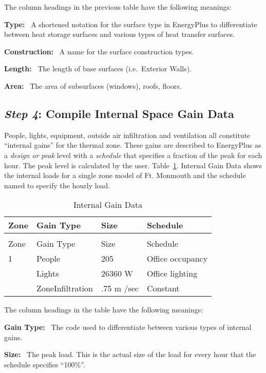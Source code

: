The column headings in the previous table have the following meanings:

\textbf{Type:}~ A shortened notation for the surface type in EnergyPlus to differentiate between heat storage surfaces and various types of heat transfer surfaces.

\textbf{Construction:}~ A name for the surface construction types.

\textbf{Length:}~ The length of base surfaces (i.e.~Exterior Walls).

\textbf{Area:}~ The area of subsurfaces (windows), roofs, floors.

\subsection{\emph{Step 4}: Compile Internal Space Gain Data}\label{step-4-compile-internal-space-gain-data}

People, lights, equipment, outside air infiltration and ventilation all constitute ``internal gains'' for the thermal zone. These gains are described to EnergyPlus as a \emph{design or} \emph{peak} level with a \emph{schedule} that specifies a fraction of the peak for each hour. The peak level is calculated by the user. Table~\ref{table:internal-gain-data}. Internal Gain Data shows the internal loads for a single zone model of Ft. Monmouth and the schedule named to specify the hourly load.

\begin{longtable}[c]{@{}llll@{}}
\caption{Internal Gain Data \label{table:internal-gain-data}} \tabularnewline
\toprule 
Zone & Gain Type & Size & Schedule \tabularnewline
\midrule
\endfirsthead

\caption[]{Internal Gain Data} \tabularnewline
\toprule 
Zone & Gain Type & Size & Schedule \tabularnewline
\midrule
\endhead

1 & People & 205 & Office occupancy \tabularnewline
~ & Lights & 26360 W & Office lighting \tabularnewline
~ & ZoneInfiltration & .75 m  /sec & Constant \tabularnewline
\bottomrule
\end{longtable}

The column headings in the table have the following meanings:

\textbf{Gain Type:}~ The code used to differentiate between various types of internal gains.

\textbf{Size:}~ The peak load. This is the actual size of the load for every hour that the schedule specifies ``100\%''.


